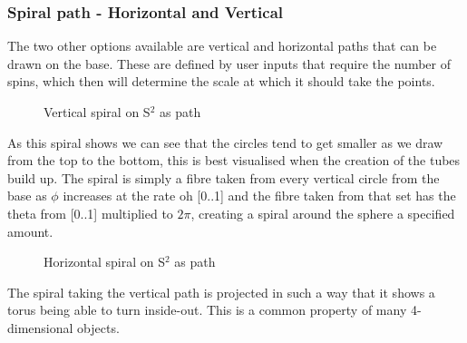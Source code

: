 \documentclass[12pt]{article} %
\begin{document}
\begin{flushleft}
\subsubsection{Spiral path - Horizontal and Vertical} %
The two other options available are vertical and horizontal paths that can be drawn on the base. These are defined by user inputs that require the number of spins, which then will determine the scale at which it should take the points.
\begin{figure}[H] %
\caption{Vertical spiral on S$^{2}$ as path}
\label{fig:speciation}
\end{figure}
As this spiral shows we can see that the circles tend to get smaller as we draw from the top to the bottom, this is best visualised when the creation of the tubes build up. The spiral is simply a fibre taken from every vertical circle from the base as $\phi$ increases at the rate oh [0..1] and the fibre taken from that set has the theta from [0..1] multiplied to $2\pi$, creating a spiral around the sphere a specified amount.
\begin{figure}[H] %
\caption{Horizontal spiral on S$^{2}$ as path}
\label{fig:speciation}
\end{figure}
The spiral taking the vertical path is projected in such a way that it shows a torus being able to turn inside-out. This is a common property of many 4-dimensional objects.\\

\end{flushleft}
\end{document}

